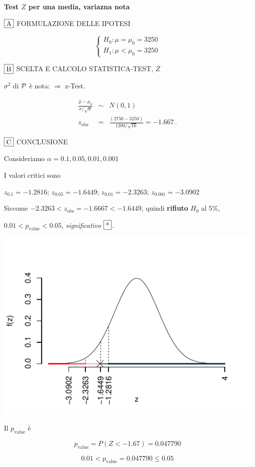 \documentclass[
  11pt,
]{book}
\theoremstyle{mytheoremstyle}
\theoremstyle{mydefstyle}
\newenvironment{sol}
  {
  \begin{tcolorbox}[enhanced,breakable,arc=0.1mm,boxrule=1pt,colback=white,colframe=iblue,
  title=\bf \fontfamily{lmss}\selectfont \hspace{.5 cm} Soluzione,drop fuzzy shadow]

}{
\end{tcolorbox}
  }
\begin{document}
\begin{sol}
\textbf{Test \(Z\) per una media, variazna nota}

\(\fbox{A}\) FORMULAZIONE DELLE IPOTESI

\[\begin{cases}
   H_0: \mu = \mu_0=3250 \\
   H_1: \mu < \mu_0=3250 
   \end{cases}\]

\(\fbox{B}\) SCELTA E CALCOLO STATISTICA-TEST, \(Z\)

\(\sigma^{2}\) di \(\cal{P}\) è nota: \(\Rightarrow\) z-Test.

\begin{eqnarray*}
   \frac{\hat\mu - \mu_{0}} {\sigma/\sqrt{n}}&\sim&N(0,1)\\
   z_{\text{obs}}
   &=& \frac{ ( 2750 -  3250 )} { 1200 /\sqrt{ 16 }}
   =   -1.667 \, .
   \end{eqnarray*}

\(\fbox{C}\) CONCLUSIONE

Consideriamo \(\alpha=0.1, 0.05, 0.01, 0.001\)

I valori critici sono

\(z_{0.1}=-1.2816\); \(z_{0.05}=-1.6449\); \(z_{0.01}=-2.3263\); \(z_{0.001}=-3.0902\)

Siccome \(-2.3263<z_\text{obs}=-1.6667<-1.6449\), quindi \textbf{rifiuto} \(H_0\) al 5\%,

\(0.01<p_\text{value}<0.05\), \emph{significativo} \(\fbox{*}\).

\begin{center}\includegraphics{Esami_passati_con_soluzioni_files/figure-latex/2021-90-1} \end{center}

Il \(p_{\text{value}}\) è

\[ p_{\text{value}} = P(Z<-1.67)=0.047790 \]

\[
 0.01 < p_\text{value}= 0.047790 \leq 0.05 
\]

\end{sol}
\end{document}
